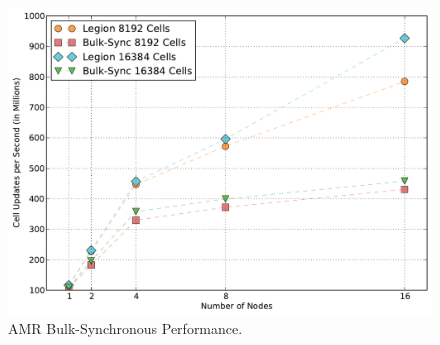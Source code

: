 \begin{figure}
\begin{center}
\includegraphics[scale=0.33]{figs/amr_bulk_sync.pdf}
\end{center}
\vspace{-6mm}
\caption{AMR Bulk-Synchronous Performance.\label{fig:amrbulk}}
\vspace{-4mm}
\end{figure}


